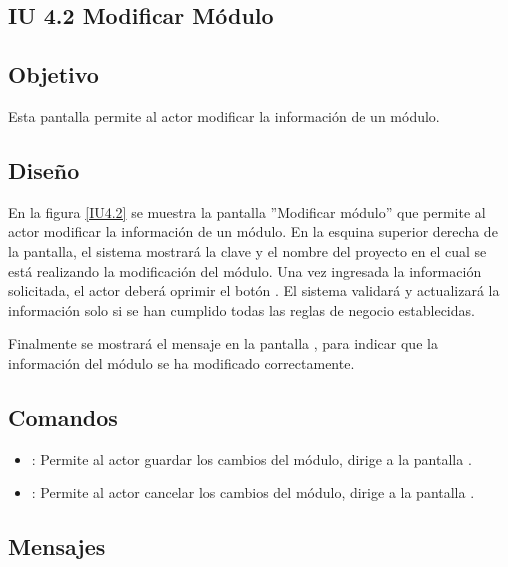 \subsection{IU 4.2 Modificar Módulo}

\subsection{Objetivo}
	Esta pantalla permite al actor modificar la información de un módulo.
\subsection{Diseño}
	En la figura \ref{IU4.2} se muestra la pantalla ''Modificar módulo'' que permite al actor modificar la información de un módulo. En la esquina superior derecha de la pantalla, el sistema mostrará la clave y el nombre del proyecto en el cual se está realizando la modificación del módulo.
	Una vez ingresada la información solicitada, el actor deberá oprimir el botón  . El sistema validará y actualizará la información solo si se han cumplido todas las reglas de negocio establecidas.
	
	Finalmente se mostrará el mensaje  en la pantalla , para indicar que la información del módulo se ha modificado correctamente.

\label{IU4.2}
\subsection{Comandos}
\begin{itemize}
	\item {}: Permite al actor guardar los cambios del módulo, dirige a la pantalla .
	\item {}: Permite al actor cancelar los cambios del módulo, dirige a la pantalla .
\end{itemize}

\subsection{Mensajes}

